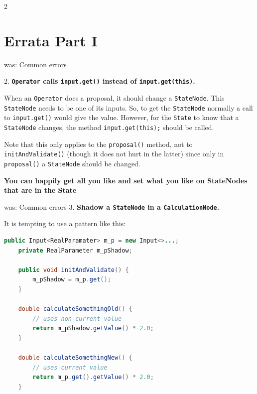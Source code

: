 \documentclass{beamer}
\def\part{2}
\theoremstyle{definition}
\begin{document}
\fi
\if \part 2



\section{Errata Part I}

\begin{frame}{was: Common errors}

2. {\bf\color{red} { \tt Operator} calls {\tt input.get()} instead of {\tt input.get(this)}.}

When an {\tt Operator} does a proposal, it should change a {\tt StateNode}.
This {\tt StateNode} needs to be one of its inputs. So, to get the {\tt StateNode}
normally a call to {\tt input.get()} would give the value. However, for the
{\tt State} to know that a {\tt StateNode} changes, the method {\tt input.get(this);}
should be called.

Note that this only applies to the {\tt proposal()} method, not to {\tt initAndValidate()}
(though it does not hurt in the latter) since only in {\tt proposal()} a {\tt StateNode}
should be changed.
\pause
{}\vskip0.5cm

{\bf\color{green}You can happily get all you like  
\color{red} and set what you like on StateNodes that are in the State}

\end{frame}

\begin{frame}[containsverbatim]{was: Common errors}
3. {\bf\color{red} Shadow a {\tt StateNode} in a {\tt CalculationNode}.}

It is tempting to use a pattern like this:

\color{blue}\begin{lstlisting}[language=java]
public Input<RealParamater> m_p = new Input<>...;
    private RealParameter m_pShadow;

    public void initAndValidate() {
        m_pShadow = m_p.get();
    }
    
    double calculateSomethingOld() {
        // uses non-current value
        return m_pShadow.getValue() * 2.0;
    }

    double calculateSomethingNew() {
        // uses current value
        return m_p.get().getValue() * 2.0;
    }
\end{lstlisting}
\end{frame}
\end{document}
